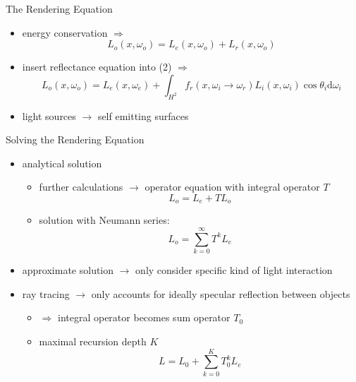 \begin{frame}{The Rendering Equation}
\begin{itemize}
\pause
\item energy conservation $\Rightarrow$
\begin{equation}
L_o(x, \omega_o) =  L_e(x, \omega_o) +  L_r(x, \omega_o)
\end{equation}
\pause
\item insert reflectance equation into (2) $\Rightarrow$
\begin{equation} L_o(x, \omega_o) =  L_e(x, \omega_e) + \int_{H^2} f_r(x, \omega_i \rightarrow \omega_r) L_i(x, \omega_i) \cos \theta_i \mathrm{d}\omega_i 
\end{equation}
\pause
\item light sources  $\rightarrow$ self emitting surfaces
\end{itemize}
\end{frame}

\begin{frame}{Solving the Rendering Equation}
\begin{itemize}
\item analytical solution 
\begin{itemize}
\pause
\item  further calculations $\rightarrow$ operator equation with integral operator $T$
\begin{equation}
    L_o = L_e + TL_o
\end{equation}
\pause
\item solution with Neumann series: 
\begin{equation}
    L_o = \sum_{k= 0}^{\infty} T^k L_e
\end{equation}
\end{itemize}
\pause
\item approximate solution $\rightarrow$ only consider specific kind of light interaction
\pause
\item ray tracing $\rightarrow$ only accounts for ideally specular reflection between objects
\begin{itemize}
    \pause
    \item  $\Rightarrow$ integral operator becomes sum operator 
    $T_0$
    \pause
    \item maximal recursion depth $K$
    \pause
\begin{equation}
     L = L_0 + \sum_{k= 0}^{K} T_0^k L_e
\end{equation}
\end{itemize}
\end{itemize}
\end{frame}

